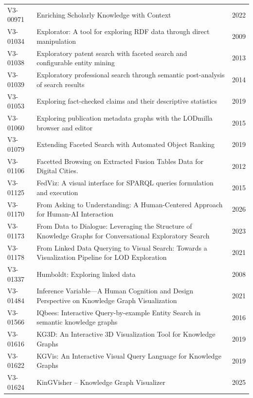 \documentclass[manuscript,review,screen]{acmart}
\begin{document}
\begin{longtable}{@{}L{21mm}L{107mm}L{17mm}@{}}
V3-00971 & Enriching Scholarly Knowledge with Context & 2022 \citep{V3-00971}\\
V3-01034 & Explorator: A tool for exploring RDF data through direct manipulation & 2009 \citep{V3-01034}\\
V3-01038 & Exploratory patent search with faceted search and configurable entity mining & 2013 \citep{V3-01038}\\
V3-01039 & Exploratory professional search through semantic post-analysis of search results & 2014 \citep{V3-01039}\\
V3-01053 & Exploring fact-checked claims and their descriptive statistics & 2019 \citep{V3-01053}\\
V3-01060 & Exploring publication metadata graphs with the LODmilla browser and editor & 2015 \citep{V3-01060}\\
V3-01079 & Extending Faceted Search with Automated Object Ranking & 2019 \citep{V3-01079}\\
V3-01106 & Facetted Browsing on Extracted Fusion Tables Data for Digital Cities. & 2012 \citep{V3-01106}\\
V3-01125 & FedViz: A visual interface for SPARQL queries formulation and execution & 2015 \citep{V3-01125}\\
V3-01170 & From Asking to Understanding: A Human-Centered Approach for Human-AI Interaction & 2026 \citep{V3-01170}\\
V3-01173 & From Data to Dialogue: Leveraging the Structure of Knowledge Graphs for Conversational Exploratory Search & 2023 \citep{V3-01173}\\
V3-01178 & From Linked Data Querying to Visual Search: Towards a Visualization Pipeline for LOD Exploration & 2021 \citep{V3-01178}\\
V3-01337 & Humboldt: Exploring linked data & 2008 \citep{V3-01337}\\
V3-01484 & Inference Variable---A Human Cognition and Design Perspective on Knowledge Graph Visualization & 2021 \citep{V3-01484}\\
V3-01566 & IQbees: Interactive Query-by-example Entity Search in semantic knowledge graphs & 2016 \citep{V3-01566}\\
V3-01616 & KG3D: An Interactive 3D Visualization Tool for Knowledge Graphs & 2019 \citep{V3-01616}\\
V3-01622 & KGVis: An Interactive Visual Query Language for Knowledge Graphs & 2019 \citep{V3-01622}\\
V3-01624 & KinGVisher -- Knowledge Graph Visualizer & 2025 \citep{V3-01624}\\

\end{longtable}
\end{document}
